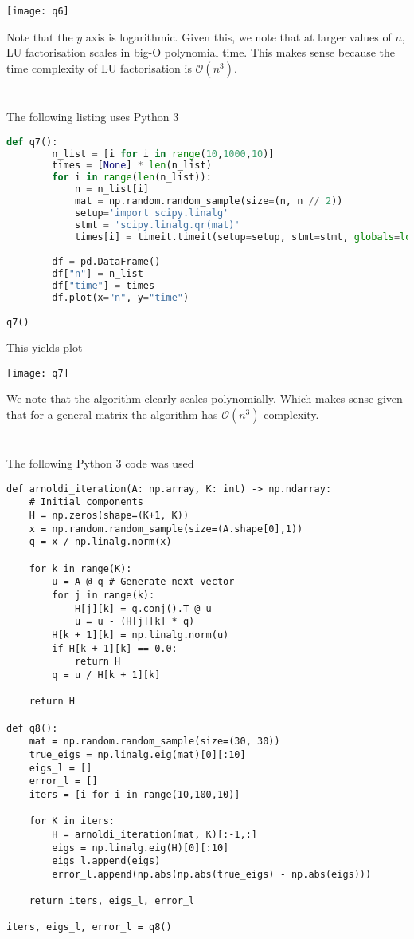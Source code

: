 \documentclass{article}
\renewcommand{\O}[1]{\mathcal{O}(#1)}
\begin{document}
\texttt{[image: q6]}

Note that the $y$ axis is logarithmic. Given this, we note that at larger
values of $n$, LU factorisation scales in big-O polynomial time. This makes
sense because the time complexity of LU factorisation is $\O{n^3}$.

\section{} %
The following listing uses Python 3

\begin{lstlisting}[language=Python]
    def q7():
        n_list = [i for i in range(10,1000,10)]
        times = [None] * len(n_list)
        for i in range(len(n_list)):
            n = n_list[i]
            mat = np.random.random_sample(size=(n, n // 2))
            setup='import scipy.linalg'
            stmt = 'scipy.linalg.qr(mat)'
            times[i] = timeit.timeit(setup=setup, stmt=stmt, globals=locals(), number=10)

        df = pd.DataFrame()
        df["n"] = n_list
        df["time"] = times
        df.plot(x="n", y="time")

q7()
\end{lstlisting}
This yields plot

\texttt{[image: q7]}

We note that the algorithm clearly scales polynomially. Which makes sense given
that for a general matrix the algorithm has $\O{n^3}$ complexity.


\section{} %
The following Python 3 code was used

\begin{lstlisting}
def arnoldi_iteration(A: np.array, K: int) -> np.ndarray:
    # Initial components
    H = np.zeros(shape=(K+1, K))
    x = np.random.random_sample(size=(A.shape[0],1))
    q = x / np.linalg.norm(x)

    for k in range(K):
        u = A @ q # Generate next vector
        for j in range(k):
            H[j][k] = q.conj().T @ u
            u = u - (H[j][k] * q)
        H[k + 1][k] = np.linalg.norm(u)
        if H[k + 1][k] == 0.0:
            return H
        q = u / H[k + 1][k]

    return H

def q8():
    mat = np.random.random_sample(size=(30, 30))
    true_eigs = np.linalg.eig(mat)[0][:10]
    eigs_l = []
    error_l = []
    iters = [i for i in range(10,100,10)]

    for K in iters:
        H = arnoldi_iteration(mat, K)[:-1,:]
        eigs = np.linalg.eig(H)[0][:10]
        eigs_l.append(eigs)
        error_l.append(np.abs(np.abs(true_eigs) - np.abs(eigs)))
    
    return iters, eigs_l, error_l

iters, eigs_l, error_l = q8()
\end{lstlisting}
\end{document}
